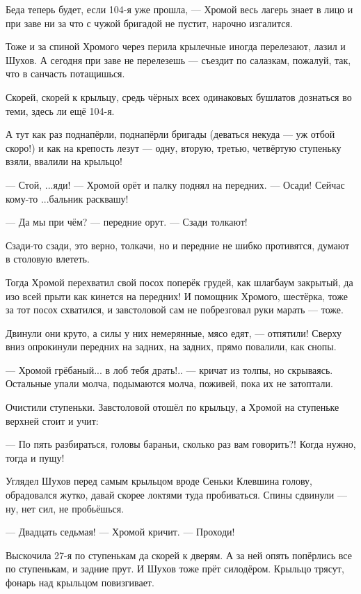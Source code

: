Беда теперь будет, если 104-я уже прошла, --- Хромой весь лагерь знает в лицо и при заве ни за что
с чужой бригадой не пустит, нарочно изгалится.

Тоже и за спиной Хромого через перила крылечные иногда перелезают, лазил и Шухов. А сегодня
при заве не перелезешь --- съездит по салазкам, пожалуй, так, что в санчасть потащишься.

Скорей, скорей к крыльцу, средь чёрных всех одинаковых бушлатов дознаться во теми, здесь ли
ещё 104-я.

А тут как раз поднапёрли, поднапёрли бригады (деваться некуда --- уж отбой скоро!) и как на
крепость лезут --- одну, вторую, третью, четвёртую ступеньку взяли, ввалили на крыльцо!

--- Стой, ...яди! --- Хромой орёт и палку поднял на передних. --- Осади! Сейчас кому-то ...бальник
расквашу!

--- Да мы при чём? --- передние орут. --- Сзади толкают!

Сзади-то сзади, это верно, толкачи, но и передние не шибко противятся, думают в столовую
влететь.

Тогда Хромой перехватил свой посох поперёк грудей, как шлагбаум закрытый, да изо всей прыти
как кинется на передних! И помощник Хромого, шестёрка, тоже за тот посох схватился, и
завстоловой сам не побрезговал руки марать --- тоже.

Двинули они круто, а силы у них немерянные, мясо едят, --- отпятили! Сверху вниз опрокинули
передних на задних, на задних, прямо повалили, как снопы.

--- Хромой грёбаный... в лоб тебя драть!.. --- кричат из толпы, но скрываясь. Остальные упали
молча, подымаются молча, поживей, пока их не затоптали.

Очистили ступеньки. Завстоловой отошёл по крыльцу, а Хромой на ступеньке верхней стоит и
учит:

--- По пять разбираться, головы бараньи, сколько раз вам говорить?! Когда нужно, тогда и пущу!

Углядел Шухов перед самым крыльцом вроде Сеньки Клевшина голову, обрадовался жутко, давай
скорее локтями туда пробиваться. Спины сдвинули --- ну, нет сил, не пробьёшься.

--- Двадцать седьмая! --- Хромой кричит. --- Проходи!

Выскочила 27-я по ступенькам да скорей к дверям. А за ней опять попёрлись все по ступенькам, и
задние прут. И Шухов тоже прёт силодёром. Крыльцо трясут, фонарь над крыльцом повизгивает.

